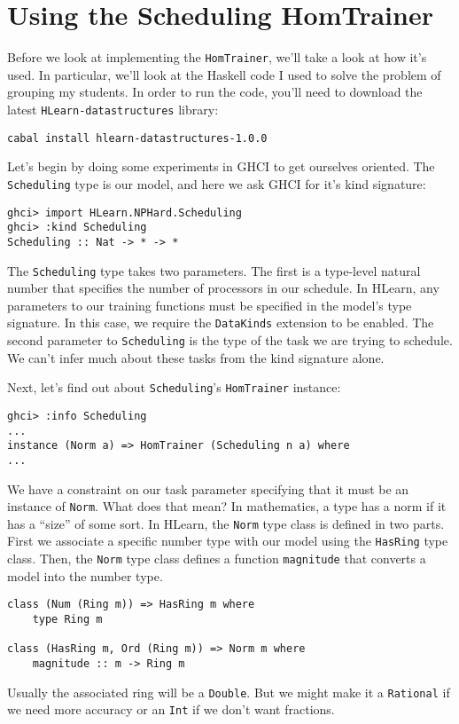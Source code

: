 \documentclass[tikz]{tmr}
\newcommand\h{\lstinline}
\newcommand{\prob}[1]{{\sc {#1}}}
\newcommand\+{\mdoubleplus}
\begin{document}
\section {Using the Scheduling HomTrainer}

Before we look at implementing the \prob{Scheduling} \h{HomTrainer}, we'll take a look at how it's used.
In particular, we'll look at the Haskell code I used to solve the problem of grouping my students.
In order to run the code, you'll need to download the latest \h{HLearn-datastructures} library:

\begin{lstlisting}
cabal install hlearn-datastructures-1.0.0
\end{lstlisting}

Let's begin by doing some experiments in GHCI to get ourselves oriented.
The \h{Scheduling} type is our model, and here we ask GHCI for it's kind signature:
\begin{lstlisting}
ghci> import HLearn.NPHard.Scheduling
ghci> :kind Scheduling
Scheduling :: Nat -> * -> *
\end{lstlisting}
The \h{Scheduling} type takes two parameters.
The first is a type-level natural number that specifies the number of processors in our schedule.
In HLearn, any parameters to our training functions must be specified in the model's type signature.
In this case, we require the \h{DataKinds} extension to be enabled.
The second parameter to \h{Scheduling} is the type of the task we are trying to schedule.
We can't infer much about these tasks from the kind signature alone.

Next, let's find out about \h{Scheduling}'s \h{HomTrainer} instance:
\begin{lstlisting}
ghci> :info Scheduling
...
instance (Norm a) => HomTrainer (Scheduling n a) where
...
\end{lstlisting}
We have a constraint on our task parameter specifying that it must be an instance of \h{Norm}.
What does that mean?
In mathematics, a type has a norm if it has a ``size'' of some sort.
In HLearn, the \h{Norm} type class is defined in two parts.
First we associate a specific number type with our model using the \h{HasRing} type class.
Then, the \h{Norm} type class defines a function \h{magnitude} that converts a model into the number type.
\begin{lstlisting}
class (Num (Ring m)) => HasRing m where
    type Ring m

class (HasRing m, Ord (Ring m)) => Norm m where
    magnitude :: m -> Ring m
\end{lstlisting}
Usually the associated ring will be a \h{Double}.
But we might make it a \h{Rational} if we need more accuracy or an \h{Int} if we don't want fractions.
\end{document}
